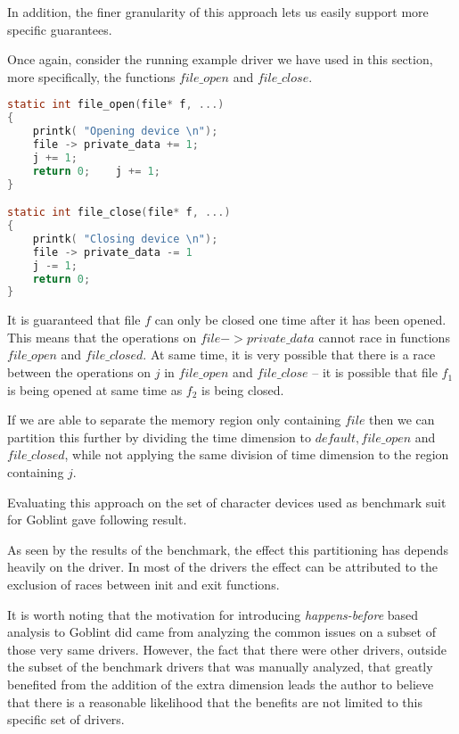 \documentclass[..thesis.tex]{subfiles}
\begin{document}


In addition, the finer granularity of this approach lets us easily support more specific guarantees.

Once again, consider the running example driver we have used in this section, more specifically, the functions $file\_open$ and $file\_close$.

\begin{lstlisting}[language=c,style=def]
static int file_open(file* f, ...)
{
    printk( "Opening device \n");
    file -> private_data += 1;
    j += 1;
    return 0;    j += 1;
}

static int file_close(file* f, ...)
{
    printk( "Closing device \n");
    file -> private_data -= 1
    j -= 1;
    return 0;
}
\end{lstlisting}

It is guaranteed that file $f$ can only be closed one time after it has been opened. This means that the operations on $file -> private\_data$
cannot race in functions $file\_open$ and $file\_closed$. At same time, it is very possible that there is a race between the operations on $j$ in $file\_open$ and $file\_close$
-- it is possible that file $f_1$ is being opened at same time as $f_2$ is being closed. 

If we are able to separate the memory region only containing $file$ then we can partition this further by dividing the time dimension to $default, file\_open$ and $file\_closed$,
while not applying the same division of time dimension to the region containing $j$. 


Evaluating this approach on the set of character devices used as benchmark suit for Goblint gave following result.


As seen by the results of the benchmark, the effect this partitioning has depends heavily on the driver.
In most of the drivers the effect can be attributed to the exclusion of races between init and exit functions. 


It is worth noting that the motivation for introducing \textit{happens-before} based analysis to Goblint did came from analyzing the common issues on a subset of those very same drivers.
However, the fact that there were other drivers, outside the subset of the benchmark drivers that was manually analyzed,
that greatly benefited from the addition of the extra dimension leads the author to believe that there is a reasonable likelihood
that the benefits are not limited to this specific set of drivers.
\end{document}
